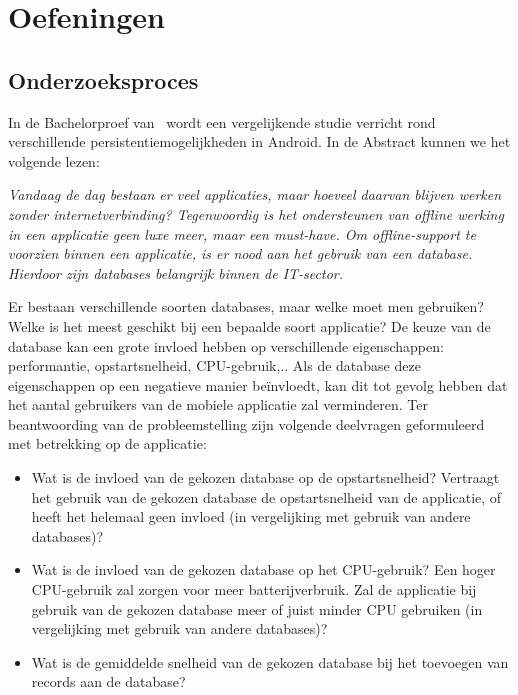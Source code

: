 \section{Oefeningen}
\label{sec:onderzoeksproces-oefeningen}

\subsection{Onderzoeksproces}

In de Bachelorproef van~\textcite{Akin2016} wordt een vergelijkende studie verricht rond verschillende persistentiemogelijkheden in Android. In de Abstract kunnen we het volgende lezen:

\begin{displayquote}
  \itshape
  Vandaag de dag bestaan er veel applicaties, maar hoeveel daarvan blijven werken zonder internetverbinding? Tegenwoordig is het ondersteunen van offline werking in een applicatie geen luxe meer, maar een must-have. Om offline-support te voorzien binnen een applicatie, is er nood aan het gebruik van een database. Hierdoor zijn databases belangrijk binnen de IT-sector.
  
  Er bestaan verschillende soorten databases, maar welke moet men gebruiken?
  Welke is het meest geschikt bij een bepaalde soort applicatie? De keuze van de database kan een grote invloed hebben op verschillende eigenschappen: performantie, opstartsnelheid, CPU-gebruik,.. Als de database deze eigenschappen op een negatieve manier be\"invloedt, kan dit tot gevolg hebben dat het aantal gebruikers van de mobiele applicatie zal verminderen. Ter beantwoording van de probleemstelling zijn volgende deelvragen geformuleerd met betrekking op de applicatie:

  \begin{itemize}
    \item 	Wat is de invloed van de gekozen database op de opstartsnelheid? Vertraagt het gebruik van de gekozen database de opstartsnelheid van de applicatie, of heeft het helemaal geen invloed (in vergelijking met gebruik van andere databases)?
    \item Wat is de invloed van de gekozen database op het CPU-gebruik? Een hoger
    CPU-gebruik zal zorgen voor meer batterijverbruik. Zal de applicatie bij gebruik van de gekozen database meer of juist minder CPU gebruiken (in vergelijking met gebruik van andere databases)?
    \item  Wat is de gemiddelde snelheid van de gekozen database bij het toevoegen van records aan de database?
  \end{itemize}
  

\end{displayquote}
